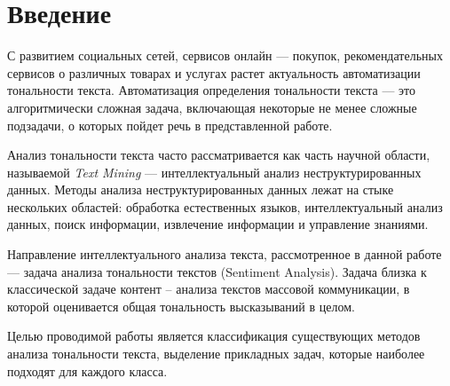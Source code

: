 \chapter{Введение}
\setcounter{page}{2}
С развитием социальных сетей, сервисов онлайн --- покупок, рекомендательных сервисов о различных товарах и услугах растет актуальность автоматизации тональности текста. Автоматизация определения тональности текста --- это алгоритмически сложная задача, включающая некоторые не менее сложные подзадачи, о которых пойдет речь в представленной работе.

Анализ тональности текста часто рассматривается как часть научной области, называемой \textit{Text Mining} --- интеллектуальный анализ неструктурированных данных. Методы анализа неструктурированных данных лежат на стыке нескольких областей: обработка естественных языков, интеллектуальный анализ данных, поиск информации, извлечение информации и управление знаниями.\cite{data_mining}

Направление интеллектуального анализа текста, рассмотренное в данной работе --- задача анализа тональности текстов (Sentiment Analysis). Задача близка к классической задаче контент -- анализа текстов массовой коммуникации, в которой оценивается общая тональность высказываний в целом. 

Целью проводимой работы является классификация существующих методов анализа тональности текста, выделение прикладных задач, которые наиболее подходят для каждого класса.